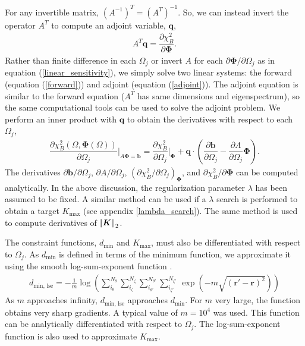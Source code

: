 \documentclass[aps,unsortedaddress]{revtex4-1}
\newcommand{\partder}[2]{\dfrac{\partial  #1}{\partial  #2}}
\begin{document}
For any invertible matrix, $\left( A^{-1} \right)^T = \left( A^{T} \right)^{-1}$. So, we can instead invert the operator $A^T$ to compute an adjoint variable, $\bm{q}$,
\begin{gather}
A^T \bm{q} = \partder{\chi^2_B}{\bm{\Phi}}.
\label{adjoint}
\end{gather}
Rather than finite difference in each $\Omega_j$ or invert $A$ for each $\partial \bm{\Phi}/\partial \Omega_j$ as in equation (\ref{linear_sensitivity}), we simply solve two linear systems: the forward (equation (\ref{forward})) and adjoint (equation (\ref{adjoint})). The adjoint equation is similar to the forward equation ($A^T$ has same dimensions and eigenspectrum), so the same computational tools can be used to solve the adjoint problem. We perform an inner product with $\bm{q}$ to obtain the derivatives with respect to each $\Omega_j$,
\begin{gather}
\partder{\chi^2_B(\Omega, \bm{\Phi}(\Omega))}{\Omega_j} \bigg \rvert_{A \bm{\Phi} = \bm{b}} = \partder{\chi^2_B}{\Omega_j} \bigg \rvert_{\bm{\Phi}} + \bm{q} \cdot \left( \partder{\bm{b}}{\Omega_j} - \partder{A}{\Omega_j} \bm{\Phi} \right).
\label{adjointsensitivity}
\end{gather}
The derivatives $\partial \bm{b}/\partial \Omega_j$, $\partial A/\partial \Omega_j$, $\left( \partial \chi^2_B/\partial \Omega_j \right)_{\bm{\Phi}}$, and $\partial \chi^2_B/\partial \bm{\Phi}$ can be computed analytically. In the above discussion, the regularization parameter $\lambda$ has been assumed to be fixed. A similar method can be used if a $\lambda$ search is performed to obtain a target $K_{\text{max}}$ (see appendix \ref{lambda_search}). The same method is used to compute derivatives of $\norm{\bm{K}}_2$. 

The constraint functions, $d_{\text{min}}$ and $K_{\text{max}}$, must also be differentiated with respect to $\Omega_j$. As $d_{\text{min}}$ is defined in terms of the minimum function, we approximate it using the smooth log-sum-exponent function \cite{Boyd2004}.
\begin{gather}
d_{\text{min, lse}} = - \frac{1}{m} \log \left( \sum_{i_{\theta}}^{N_{\theta}} \sum_{i_{\zeta}}^{N_{\zeta}} \sum_{i_{\theta'}}^{N_{\theta'}} \sum_{i_{\zeta'}}^{N_{\zeta'}} \, \exp \left( - m \sqrt{(\bm{r}' - \bm{r})^2} \right) \right)
\label{lse_d}
\end{gather}
As $m$ approaches infinity, $d_{\text{min, lse}}$ approaches $d_{\text{min}}$. For $m$ very large, the function obtains very sharp gradients. A typical value of $m = 10^4$ was used. This function can be analytically differentiated with respect to $\Omega_j$. The log-sum-exponent function is also used to approximate $K_{\text{max}}$. 
\end{document}
